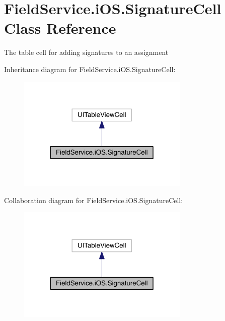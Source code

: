 \hypertarget{class_field_service_1_1i_o_s_1_1_signature_cell}{\section{Field\+Service.\+i\+O\+S.\+Signature\+Cell Class Reference}
\label{class_field_service_1_1i_o_s_1_1_signature_cell}
}


The table cell for adding signatures to an assignment  




Inheritance diagram for Field\+Service.\+i\+O\+S.\+Signature\+Cell\+:
\nopagebreak
\begin{figure}[H]
\begin{center}
\leavevmode
\includegraphics[width=232pt]{class_field_service_1_1i_o_s_1_1_signature_cell__inherit__graph}
\end{center}
\end{figure}


Collaboration diagram for Field\+Service.\+i\+O\+S.\+Signature\+Cell\+:
\nopagebreak
\begin{figure}[H]
\begin{center}
\leavevmode
\includegraphics[width=232pt]{class_field_service_1_1i_o_s_1_1_signature_cell__coll__graph}
\end{center}
\end{figure}
